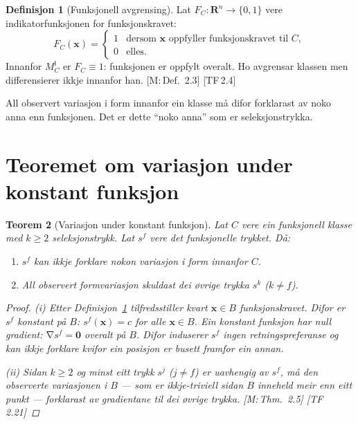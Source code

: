 \documentclass[10pt]{book}
\theoremstyle{definition}
\newtheorem{definisjon}{Definisjon}[chapter]
\theoremstyle{plain}
\newtheorem{teorem}[definisjon]{Teorem}
\theoremstyle{remark}
\newcommand{\MC}{M^{\mathsf{I}}_C}
\providecommand{\Rn}{}
\renewcommand{\Rn}{\mathbf{R}^n}
\DeclareMathOperator{\grad}{\nabla}
\newcommand{\TF}[1]{\textnormal{[TF\,#1]}}
\newcommand{\Mref}[1]{\textnormal{[M:\,#1]}}
\begin{document}
\begin{definisjon}[Funksjonell avgrensing]\label{def:funkavgr}
Lat $F_C : \Rn \to \{0, 1\}$ vere indikatorfunksjonen for funksjonskravet:
\[
  F_C(\bm{x}) =
  \begin{cases}
    1 & \text{dersom } \bm{x} \text{ oppfyller funksjonskravet til } C, \\
    0 & \text{elles.}
  \end{cases}
\]
Innanfor $\MC$ er $F_C \equiv 1$: funksjonen er oppfylt overalt. Ho avgrensar klassen men differensierer ikkje innanfor han. \Mref{Def.~2.3} \TF{2.4}
\end{definisjon}

All observert variasjon i form innanfor ein klasse m\aa{} difor forklarast av noko anna enn funksjonen. Det er dette ``noko anna'' som er seleksjonstrykka.

\section{Teoremet om variasjon under konstant funksjon}\label{sec:seleksjon:variasjon}

\begin{teorem}[Variasjon under konstant funksjon]\label{thm:variasjon}
Lat $C$ vere ein funksjonell klasse med $k \geq 2$ seleksjonstrykk. Lat $s^f$ vere det funksjonelle trykket. D\aa:
\begin{enumerate}[label=(\roman*)]
  \item $s^f$ kan ikkje forklare nokon variasjon i form innanfor $C$.
  \item All observert formvariasjon skuldast dei \o vrige trykka $s^k$ ($k \neq f$).
\end{enumerate}

\begin{proof}
\textit{(i)} Etter Definisjon~\ref{def:funkavgr} tilfredsstiller kvart $\bm{x} \in B$ funksjonskravet. Difor er $s^f$ konstant p\aa{} $B$: $s^f(\bm{x}) = c$ for alle $\bm{x} \in B$. Ein konstant funksjon har null gradient: $\grad s^f = \bm{0}$ overalt p\aa{} $B$. Difor induserer $s^f$ ingen retningspreferanse og kan ikkje forklare kvifor ein posisjon er busett framfor ein annan.

\textit{(ii)} Sidan $k \geq 2$ og minst eitt trykk $s^j$ ($j \neq f$) er uavhengig av $s^f$, m\aa{} den observerte variasjonen i $B$ --- som er ikkje-triviell sidan $B$ inneheld meir enn eitt punkt --- forklarast av gradientane til dei \o vrige trykka. \Mref{Thm.~2.5} \TF{2.21}
\end{proof}
\end{teorem}
\end{document}
